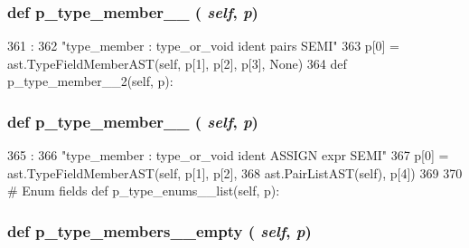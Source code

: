 \begin{DoxyVerb}
{\subsubsection[{p\_\-type\_\-member\_\-\_\-1}]{\setlength{\rightskip}{0pt plus 5cm}def p\_\-type\_\-member\_\-\_ ( {\em self}, \/   {\em p})}}
\label{classslicc_1_1parser_1_1SLICC_ac6f9f3e8882575559628a5c9687438e6}



\begin{DoxyCode}
361                                  :
362         "type_member : type_or_void ident pairs SEMI"
363         p[0] = ast.TypeFieldMemberAST(self, p[1], p[2], p[3], None)
364 
    def p_type_member__2(self, p):
\end{DoxyCode}
\hypertarget{classslicc_1_1parser_1_1SLICC_aa863c975771051b0c15dbb988b31ba83}{
\subsubsection[{p\_\-type\_\-member\_\-\_\-2}]{\setlength{\rightskip}{0pt plus 5cm}def p\_\-type\_\-member\_\-\_ ( {\em self}, \/   {\em p})}}
\label{classslicc_1_1parser_1_1SLICC_aa863c975771051b0c15dbb988b31ba83}



\begin{DoxyCode}
365                                  :
366         "type_member : type_or_void ident ASSIGN expr SEMI"
367         p[0] = ast.TypeFieldMemberAST(self, p[1], p[2],
368                                       ast.PairListAST(self), p[4])
369 
370     # Enum fields
    def p_type_enums__list(self, p):
\end{DoxyCode}
\hypertarget{classslicc_1_1parser_1_1SLICC_a9184c0f6c2ca85dcd779db7b505176d2}{
\subsubsection[{p\_\-type\_\-members\_\-\_\-empty}]{\setlength{\rightskip}{0pt plus 5cm}def p\_\-type\_\-members\_\-\_\-empty ( {\em self}, \/   {\em p})}}
\label{classslicc_1_1parser_1_1SLICC_a9184c0f6c2ca85dcd779db7b505176d2}




\end{DoxyVerb}
